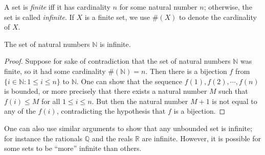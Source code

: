 \begin{definition}\label{definition 3.6.3}
A set is \emph{finite} iff it has cardinality \(n\) for some natural number \(n\);
otherwise, the set is called \emph{infinite}.
If \(X\) is a finite set, we use \(\#(X)\) to denote the cardinality of \(X\).
\end{definition}

\begin{theorem}\label{theorem 3.6.1}
The set of natural numbers \(\mathds{N}\) is infinite.
\end{theorem}

\begin{proof}
Suppose for sake of contradiction that the set of natural numbers \(\mathds{N}\) was finite, so it had some cardinality \(\#(\mathds{N}) = n\).
Then there is a bijection \(f\) from \(\{i \in \mathds{N} : 1 \leq i \leq n\}\) to \(\mathds{N}\).
One can show that the sequence \(f(1), f(2), \cdots, f(n)\) is bounded, or more precisely that there exists a natural number \(M\) such that \(f(i) \leq M\) for all \(1 \leq i \leq n\).
But then the natural number \(M+1\) is not equal to any of the \(f(i)\), contradicting the hypothesis that \(f\) is a bijection.
\end{proof}

\begin{remark}
One can also use similar arguments to show that any unbounded set is infinite;
for instance the rationals \(\mathds{Q}\) and the reals \(\mathds{R}\) are infinite.
However, it is possible for some sets to be ``more'' infinite than others.
\end{remark}

